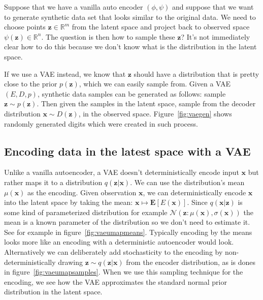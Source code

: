\documentclass[11pt, a4paper]{report}
\theoremstyle{plain}
\theoremstyle{definition}
\theoremstyle{remark}
\newcommand{\R}{\mathbb{R}}
\newcommand{\E}{\mathbf{E}}
\newcommand{\x}{\mathbf{x}}
\newcommand{\z}{\mathbf{z}}
\newcommand{\NN}{\mathcal{N}}
\begin{document}
Suppose that we have a vanilla auto encoder $(\phi, \psi)$ and suppose that we
want to generate synthetic data set that looks similar to the original data.
We need to choose points $\z \in \R^m$ from the latent space and project back to
observed space $\psi(\z) \in \R^n$. The question is then how to sample these $\z$?
It's not immediately clear how to do this because we don't know what is the
distribution in the latent space.

If we use a VAE instead, we know that $\z$ should have a distribution that is pretty
close to the prior $p(\z)$, which we can easily sample from.
Given a VAE $(E, D, p)$, synthetic data samples can be generated as follows:
sample $\z \sim p(\z)$. Then given the samples in the latent space, sample
from the decoder distribution $\x \sim D(\z)$, in the observed space.
Figure~\ref{fig:vaegen} shows randomly generated digits which were created in such 
process.

\subsection{Encoding data in the latest space with a VAE}

Unlike a vanilla autoencoder, a VAE doesn't deterministically encode input $\x$
but rather maps it to a distribution $q(\z | \x)$.
We can use the distribution's mean $\mu(\x)$ as the
encoding. 
Given observation $\x$, we can deterministically encode $\x$ into 
the latent space by taking the mean: $\x \mapsto \E [E(\x)]$. 
Since $q(\x | \z)$ is some kind of parameterized distribution for example 
$\NN(\z: \mu(\x), \sigma(\x))$  
the mean is a known parameter of the distribution so we don't need to estimate
it. See for example in figure~\ref{fig:vaeumapmeans}. Typically encoding by the
means looks more like an encoding with a deterministic autoencoder would look.
Alternatively we can deliberately add stochasticity to the encoding by 
non-deterministically drawing $\z \sim q(\z | \x)$ from the encoder
distribution,
as is dones in figure~\ref{fig:vaeumapsamples}.
When we use this sampling technique for the encoding, we see how the VAE
approximates the standard normal prior distribution in the latent space.
\end{document}
